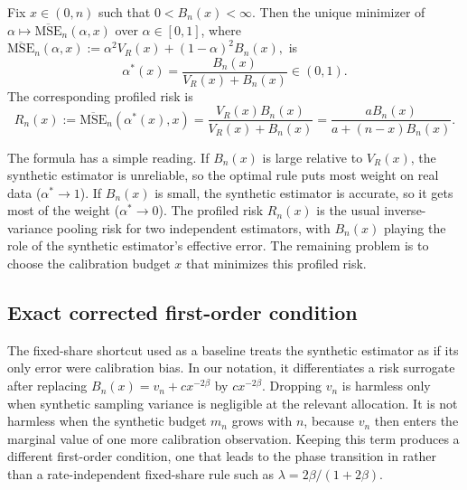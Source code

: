 \begin{proposition}\label{prop:mix}
  Fix $x\in(0,n)$ such that $0<B_n(x)<\infty$. Then the unique minimizer of $\alpha\mapsto \overline{\mathrm{MSE}}_n(\alpha,x)$ over $\alpha\in[0,1]$, where $\overline{\mathrm{MSE}}_n(\alpha,x) := \alpha^2 V_R(x)+(1-\alpha)^2 B_n(x),$ is
  \begin{equation}\label{eq:alpha-star}
    \alpha^*(x)
    =
    \frac{B_n(x)}{V_R(x)+B_n(x)}
    \in(0,1).
  \end{equation}
  The corresponding profiled risk is
  \begin{equation}\label{eq:Rn}
    R_n(x)
    :=
    \overline{\mathrm{MSE}}_n(\alpha^*(x),x)
    =
    \frac{V_R(x)B_n(x)}{V_R(x)+B_n(x)}
    =
    \frac{aB_n(x)}{a+(n-x)B_n(x)}.
  \end{equation}
\end{proposition}

The formula has a simple reading. If $B_n(x)$ is large relative to $V_R(x)$, the synthetic estimator is unreliable, so the optimal rule puts most weight on real data ($\alpha^*\to 1$). If $B_n(x)$ is small, the synthetic estimator is accurate, so it gets most of the weight ($\alpha^*\to 0$). The profiled risk $R_n(x)$ is the usual inverse-variance pooling risk for two independent estimators, with $B_n(x)$ playing the role of the synthetic estimator's effective error. The remaining problem is to choose the calibration budget $x$ that minimizes this profiled risk.

\subsection{Exact corrected first-order condition}\label{ssec:foc}

The fixed-share shortcut used as a baseline treats the synthetic estimator as if its only error were calibration bias. In our notation, it differentiates a risk surrogate after replacing $B_n(x)=v_n+cx^{-2\beta}$ by $cx^{-2\beta}$. Dropping $v_n$ is harmless only when synthetic sampling variance is negligible at the relevant allocation. It is not harmless when the synthetic budget $m_n$ grows with $n$, because $v_n$ then enters the marginal value of one more calibration observation. Keeping this term produces a different first-order condition, one that leads to the phase transition in  rather than a rate-independent fixed-share rule such as $\lambda=2\beta/(1+2\beta)$.

